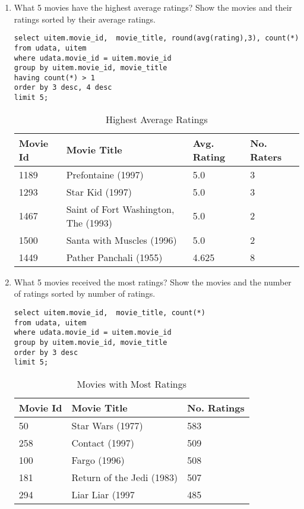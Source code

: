 \documentclass[letterpaper,11pt]{report}
\begin{document}
\begin{savenotes}
\begin{enumerate}
\item What 5 movies have the highest average ratings? Show the movies and their ratings sorted by their average ratings.
\begin{verbatim}
select uitem.movie_id,  movie_title, round(avg(rating),3), count(*) 
from udata, uitem 
where udata.movie_id = uitem.movie_id 
group by uitem.movie_id, movie_title 
having count(*) > 1 
order by 3 desc, 4 desc 
limit 5;
\end{verbatim}

\begin{table}[htbp]
\centering
    \begin{tabular}{|l|l|l|l|}
		    \hline
    Movie Id & Movie Title                          & Avg. Rating & No. Raters \\ \hline
    1189     & Prefontaine (1997)                   & 5.0         & 3          \\ \hline
    1293     & Star Kid (1997)                      & 5.0         & 3          \\ \hline
    1467     & Saint of Fort Washington, The (1993) & 5.0         & 2          \\ \hline
    1500     & Santa with Muscles (1996)            & 5.0         & 2          \\ \hline
    1449     & Pather Panchali (1955)               & 4.625       & 8          \\ \hline
    \end{tabular}
    \caption {Highest Average Ratings}
			\label{tab:HighestRatings}
\end{table}

\item What 5 movies received the most ratings? Show the movies and the number of ratings sorted by number of ratings.

\begin{verbatim}
select uitem.movie_id,  movie_title, count(*) 
from udata, uitem 
where udata.movie_id = uitem.movie_id 
group by uitem.movie_id, movie_title 
order by 3 desc 
limit 5;
\end{verbatim}

\begin{table}[htbp]
\centering
    \begin{tabular}{|l|l|l|}
    \hline
    Movie Id & Movie Title               & No. Ratings \\ \hline
    50       & Star Wars (1977)          & 583         \\ \hline
    258      & Contact (1997)            & 509         \\ \hline
    100      & Fargo (1996)              & 508         \\ \hline
    181      & Return of the Jedi (1983) & 507         \\ \hline
    294      & Liar Liar (1997           & 485         \\ \hline
    \end{tabular}
    \caption {Movies with Most Ratings}
			\label{tab:MostRatings}
\end{table}



\end{enumerate}
\end{savenotes}
\end{document}
